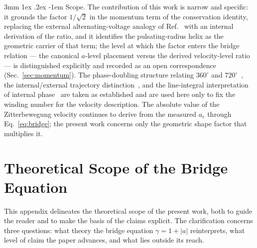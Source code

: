 \documentclass[%
 reprint, amsmath,amssymb, aps, prb, ]{revtex4-2}
\makeatletter
\numberwithin{equation}{section}
\renewcommand\paragraph{%
  \@startsection{paragraph}{4}{\z@}%
    {3mm \@plus 1ex \@minus .2ex}%
    {-1em}%
    {\normalfont\normalsize\itshape}}
\makeatother
\begin{document}
\paragraph{Scope.}
The contribution of this work is narrow and specific: it grounds the factor $1/\sqrt{2}$ in the momentum term of the conservation identity, replacing the external alternating-voltage analogy of Ref.~\cite{hanamura10} with an internal derivation of the ratio, and it identifies the pulsating-radius helix as the geometric carrier of that term; the level at which the factor enters the bridge relation --- the canonical $a$-level placement versus the derived velocity-level ratio --- is distinguished explicitly and recorded as an open correspondence (Sec.~\ref{sec:momentum}). The phase-doubling structure relating $360^\circ$ and $720^\circ$~\cite{hanamura19}, the internal/external trajectory distinction~\cite{hanamura24,hanamura29}, and the line-integral interpretation of internal phase~\cite{hanamura29} are taken as established and are used here only to fix the winding number for the velocity description. The absolute value of the Zitterbewegung velocity continues to derive from the measured $a_e$ through Eq.~\eqref{eq:bridge}; the present work concerns only the geometric shape factor that multiplies it.

\appendix

\section{Theoretical Scope of the Bridge Equation}
\label{app:scope}

This appendix delineates the theoretical scope of the present work, both to guide the reader and to make the basis of the claims explicit. The clarification concerns three questions: what theory the bridge equation $\gamma = 1 + \lvert a\rvert$ reinterprets, what level of claim the paper advances, and what lies outside its reach.
\end{document}
